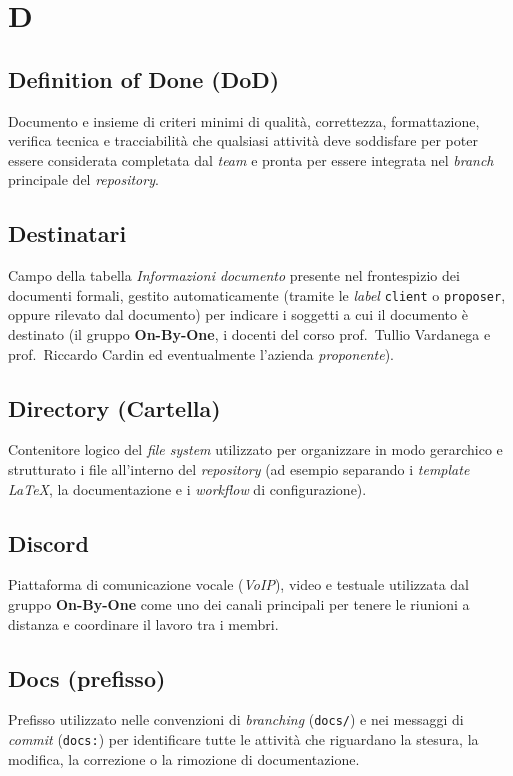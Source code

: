 \documentclass[11pt, a4paper]{article}
\begin{document}
\newpage

\section*{D}

\subsection*{Definition of Done (DoD)}
Documento e insieme di criteri minimi di qualità, correttezza, formattazione, verifica tecnica e tracciabilità che qualsiasi attività deve soddisfare per poter essere considerata completata dal \textit{team} e pronta per essere integrata nel \textit{branch} principale del \textit{repository}.

\subsection*{Destinatari}
Campo della tabella \textit{Informazioni documento} presente nel frontespizio dei documenti formali, gestito automaticamente (tramite le \textit{label} \texttt{client} o \texttt{proposer}, oppure rilevato dal documento) per indicare i soggetti a cui il documento è destinato (il gruppo \textbf{On-By-One}, i docenti del corso prof.\ Tullio Vardanega e prof.\ Riccardo Cardin ed eventualmente l'azienda \textit{proponente}).

\subsection*{Directory (Cartella)}
Contenitore logico del \textit{file system} utilizzato per organizzare in modo gerarchico e strutturato i file all'interno del \textit{repository} (ad esempio separando i \textit{template} \textit{LaTeX}, la documentazione e i \textit{workflow} di configurazione).

\subsection*{Discord}
Piattaforma di comunicazione vocale (\textit{VoIP}), video e testuale utilizzata dal gruppo \textbf{On-By-One} come uno dei canali principali per tenere le riunioni a distanza e coordinare il lavoro tra i membri.

\subsection*{Docs (prefisso)}
Prefisso utilizzato nelle convenzioni di \textit{branching} (\texttt{docs/}) e nei messaggi di \textit{commit} (\texttt{docs:}) per identificare tutte le attività che riguardano la stesura, la modifica, la correzione o la rimozione di documentazione.
\end{document}
